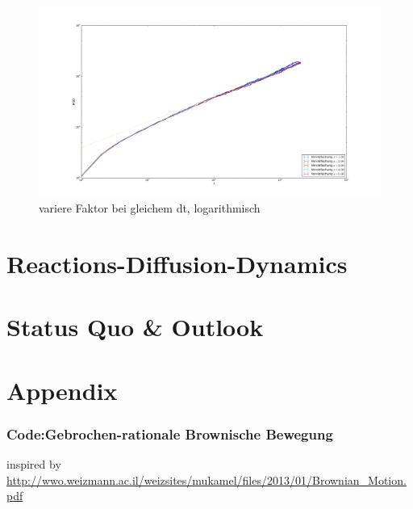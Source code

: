\documentclass[
  a4paper,BCOR10mm,oneside,
  bibtotoc,idxtotoc,
  headsepline,footsepline,%
  fleqn,openbib
]{scrbook}
\begin{document}
\begin{figure}[h]
\includegraphics[width=\textwidth]{./faktor_variert_bei_dt_1_log.pdf}
\caption{variere Faktor bei gleichem dt, logarithmisch}
 \centering
\end{figure}

\chapter{Reactions-Diffusion-Dynamics}
\chapter{Status Quo \& Outlook}
\chapter{Appendix}
\subsection{Code:Gebrochen-rationale Brownische Bewegung}


\nocite{}



inspired by \url{http://wwo.weizmann.ac.il/weizsites/mukamel/files/2013/01/Brownian_Motion.pdf}
\end{document}
